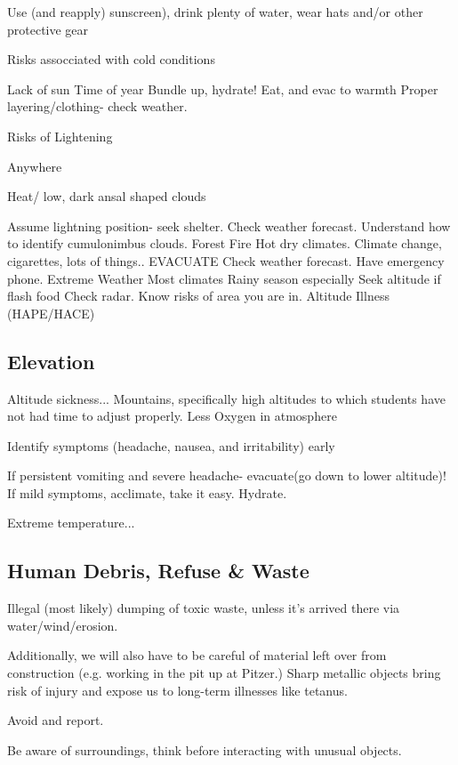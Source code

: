 \documentclass[12pt]{../SOP3_beta}\usepackage[]{graphicx}\usepackage[]{color}
\begin{document}
\NP Use (and reapply) sunscreen), drink plenty of water, wear hats and/or other protective gear

\NP Risks assocciated with cold conditions

Lack of sun
Time of year
Bundle up, hydrate! Eat, and evac to warmth
Proper layering/clothing- check weather.

\NP Risks of Lightening

Anywhere

Heat/ low, dark ansal shaped clouds

Assume lightning position- seek shelter.
Check weather forecast. Understand how to identify cumulonimbus clouds.
Forest Fire
Hot dry climates.
Climate change, cigarettes, lots of things..
EVACUATE
Check weather forecast. Have emergency phone.
Extreme Weather
Most climates
Rainy season especially
Seek altitude if flash food
Check radar. Know risks of area you are in.
Altitude Illness (HAPE/HACE)

\subsection{Elevation}

\NP Altitude sickness... Mountains, specifically high altitudes to which students have not had time to adjust properly. Less Oxygen in atmosphere

\NP Identify symptoms (headache, nausea, and irritability) early

\NP If persistent vomiting and severe headache- evacuate(go down to lower altitude)! If mild symptoms, acclimate, take it easy. Hydrate.

\NP Extreme temperature...

\NP 

\NP 

\subsection{Human Debris, Refuse \& Waste}

Illegal (most likely) dumping of toxic waste, unless it’s arrived there via water/wind/erosion.


\NP Additionally, we will also have to be careful of material left over from construction (e.g. working in the pit up at Pitzer.) Sharp metallic objects bring risk of injury and expose us to long-term illnesses like tetanus.

\NP Avoid and report.

\NP Be aware of surroundings, think before interacting with unusual objects.
\end{document}
